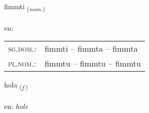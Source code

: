 \documentclass[frontgrid, backgrid]{flacards}\usepackage[]{graphicx}\usepackage[]{color}
\begin{document}
\renewcommand{\flhead}{\vskip5pt \fboxsep=0pt {\small\bfseries\footnotesize Töluorð | Numeral}}
\renewcommand{\fcfoot}{\vskip5pt \fboxsep=0pt \hspace{2pt}{\small\bfseries\footnotesize 2K}}

\renewcommand{\blhead}{\vskip5pt {\small\bfseries\footnotesize Töluorð | Numeral }}
\renewcommand{\bcfoot}{\vskip5pt \hspace{2pt}{\small\bfseries\footnotesize 2K}}


{fimmti \small{\textsubscript{(\textit{num.})}} \\[1ex] %
\textphonetic{[fɪm̥tɪ]} \\
en: \emph{} \\  [2ex]
\renewcommand*{\arraystretch}{0.8}
\begin{tabular}{ll}
\textsc{sg.dom.}: & fimmti  --  fimmta -- fimmta \\ 
\textsc{pl.nom.}: & fimmtu -- fimmtu -- fimmtu
\end{tabular}
}

\renewcommand{\flhead}{\vskip5pt \fboxsep=0pt {\small\bfseries\footnotesize Nafnorð | Noun}}
\renewcommand{\fcfoot}{\vskip5pt \fboxsep=0pt \hspace{2pt}{\small\bfseries\footnotesize 2K}}

\renewcommand{\blhead}{\vskip5pt {\small\bfseries\footnotesize Nafnorð | Noun }}
\renewcommand{\bcfoot}{\vskip5pt \hspace{2pt}{\small\bfseries\footnotesize 2K}}


{hola \small{\textsubscript{(\textit{f.})}} \\[1ex] %
\textphonetic{[hɔːla]} \\
en: \emph{hole} \\  [2ex]
\renewcommand*{\arraystretch}{0.8}
}
\end{document}
